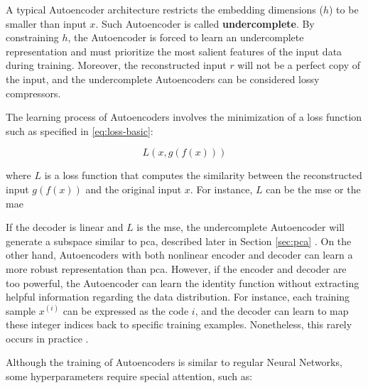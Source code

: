 A typical Autoencoder architecture restricts the embedding dimensions ($h$) to be smaller than input $x$. Such Autoencoder is called \textbf{undercomplete}. By constraining $h$, the Autoencoder is forced to learn an undercomplete representation and must prioritize the most salient features of the input data during training. Moreover, the reconstructed input $r$ will not be a perfect copy of the input, and the undercomplete Autoencoders can be considered lossy compressors.

The learning process of Autoencoders involves the minimization of a loss function such as specified in \autoref{eq:loss-basic}:

\begin{equation}
\label{eq:loss-basic}
L(x, g(f(x)))
\end{equation}

\noindent
where $L$ is a loss function that computes the similarity between the reconstructed input $g(f(x))$ and the original input $x$. For instance, $L$ can be the \acf{mse} or the \acf{mae}

If the decoder is linear and $L$ is the \acs{mse}, the undercomplete Autoencoder will generate a subspace similar to \acs{pca}, described later in Section \ref{sec:pca} \citep{lecun2015deep}. On the other hand, Autoencoders with both nonlinear encoder and decoder can learn a more robust representation than \acs{pca}. However, if the encoder and decoder are too powerful, the Autoencoder can learn the identity function without extracting helpful information regarding the data distribution. For instance, each training sample $x^{(i)}$ can be expressed as the code $i$, and the decoder can learn to map these integer indices back to specific training examples. Nonetheless, this rarely occurs in practice \citep{lecun2015deep}.

Although the training of Autoencoders is similar to regular Neural Networks, some hyperparameters require special attention, such as:


